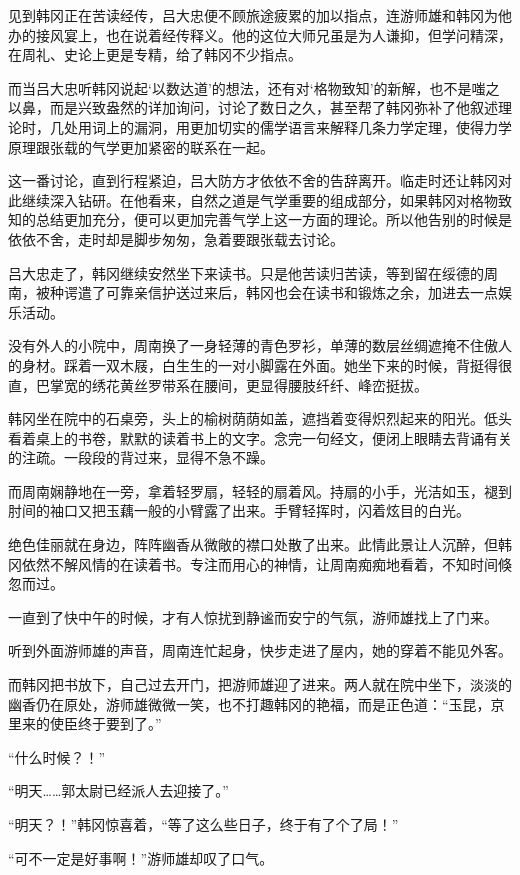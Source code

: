 见到韩冈正在苦读经传，吕大忠便不顾旅途疲累的加以指点，连游师雄和韩冈为他办的接风宴上，也在说着经传释义。他的这位大师兄虽是为人谦抑，但学问精深，在周礼、史论上更是专精，给了韩冈不少指点。

而当吕大忠听韩冈说起‘以数达道’的想法，还有对‘格物致知’的新解，也不是嗤之以鼻，而是兴致盎然的详加询问，讨论了数日之久，甚至帮了韩冈弥补了他叙述理论时，几处用词上的漏洞，用更加切实的儒学语言来解释几条力学定理，使得力学原理跟张载的气学更加紧密的联系在一起。

这一番讨论，直到行程紧迫，吕大防方才依依不舍的告辞离开。临走时还让韩冈对此继续深入钻研。在他看来，自然之道是气学重要的组成部分，如果韩冈对格物致知的总结更加充分，便可以更加完善气学上这一方面的理论。所以他告别的时候是依依不舍，走时却是脚步匆匆，急着要跟张载去讨论。

吕大忠走了，韩冈继续安然坐下来读书。只是他苦读归苦读，等到留在绥德的周南，被种谔遣了可靠亲信护送过来后，韩冈也会在读书和锻炼之余，加进去一点娱乐活动。

没有外人的小院中，周南换了一身轻薄的青色罗衫，单薄的数层丝绸遮掩不住傲人的身材。踩着一双木屐，白生生的一对小脚露在外面。她坐下来的时候，背挺得很直，巴掌宽的绣花黄丝罗带系在腰间，更显得腰肢纤纤、峰峦挺拔。

韩冈坐在院中的石桌旁，头上的榆树荫荫如盖，遮挡着变得炽烈起来的阳光。低头看着桌上的书卷，默默的读着书上的文字。念完一句经文，便闭上眼睛去背诵有关的注疏。一段段的背过来，显得不急不躁。

而周南娴静地在一旁，拿着轻罗扇，轻轻的扇着风。持扇的小手，光洁如玉，褪到肘间的袖口又把玉藕一般的小臂露了出来。手臂轻挥时，闪着炫目的白光。

绝色佳丽就在身边，阵阵幽香从微敞的襟口处散了出来。此情此景让人沉醉，但韩冈依然不解风情的在读着书。专注而用心的神情，让周南痴痴地看着，不知时间倏忽而过。

一直到了快中午的时候，才有人惊扰到静谧而安宁的气氛，游师雄找上了门来。

听到外面游师雄的声音，周南连忙起身，快步走进了屋内，她的穿着不能见外客。

而韩冈把书放下，自己过去开门，把游师雄迎了进来。两人就在院中坐下，淡淡的幽香仍在原处，游师雄微微一笑，也不打趣韩冈的艳福，而是正色道：“玉昆，京里来的使臣终于要到了。”

“什么时候？！”

“明天……郭太尉已经派人去迎接了。”

“明天？！”韩冈惊喜着，“等了这么些日子，终于有了个了局！”

“可不一定是好事啊！”游师雄却叹了口气。

